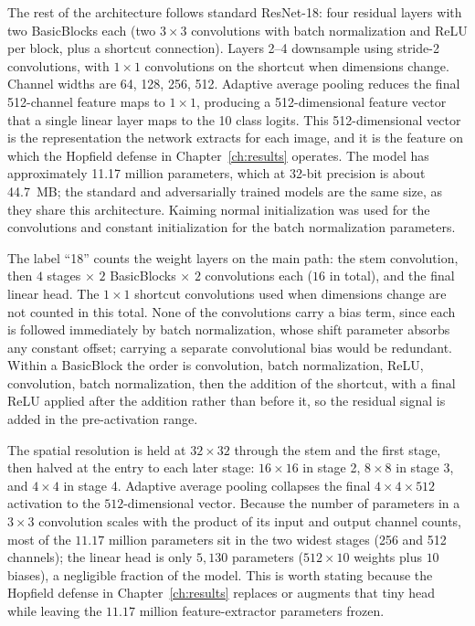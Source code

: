 The rest of the architecture follows standard ResNet-18: four residual layers with two BasicBlocks each (two $3 \times 3$ convolutions with batch normalization and ReLU per block, plus a shortcut connection). Layers 2--4 downsample using stride-2 convolutions, with $1 \times 1$ convolutions on the shortcut when dimensions change. Channel widths are 64, 128, 256, 512. Adaptive average pooling reduces the final 512-channel feature maps to $1 \times 1$, producing a 512-dimensional feature vector that a single linear layer maps to the 10 class logits. This 512-dimensional vector is the representation the network extracts for each image, and it is the feature on which the Hopfield defense in Chapter~\ref{ch:results} operates. The model has approximately 11.17 million parameters, which at 32-bit precision is about 44.7~MB; the standard and adversarially trained models are the same size, as they share this architecture. Kaiming normal initialization was used for the convolutions and constant initialization for the batch normalization parameters.

The label ``18'' counts the weight layers on the main path: the stem convolution, then $4$ stages $\times$ $2$ BasicBlocks $\times$ $2$ convolutions each ($16$ in total), and the final linear head. The $1 \times 1$ shortcut convolutions used when dimensions change are not counted in this total. None of the convolutions carry a bias term, since each is followed immediately by batch normalization, whose shift parameter absorbs any constant offset; carrying a separate convolutional bias would be redundant. Within a BasicBlock the order is convolution, batch normalization, ReLU, convolution, batch normalization, then the addition of the shortcut, with a final ReLU applied after the addition rather than before it, so the residual signal is added in the pre-activation range.

The spatial resolution is held at $32 \times 32$ through the stem and the first stage, then halved at the entry to each later stage: $16 \times 16$ in stage 2, $8 \times 8$ in stage 3, and $4 \times 4$ in stage 4. Adaptive average pooling collapses the final $4 \times 4 \times 512$ activation to the $512$-dimensional vector. Because the number of parameters in a $3 \times 3$ convolution scales with the product of its input and output channel counts, most of the $11.17$ million parameters sit in the two widest stages (256 and 512 channels); the linear head is only $5{,}130$ parameters ($512 \times 10$ weights plus $10$ biases), a negligible fraction of the model. This is worth stating because the Hopfield defense in Chapter~\ref{ch:results} replaces or augments that tiny head while leaving the $11.17$ million feature-extractor parameters frozen.

